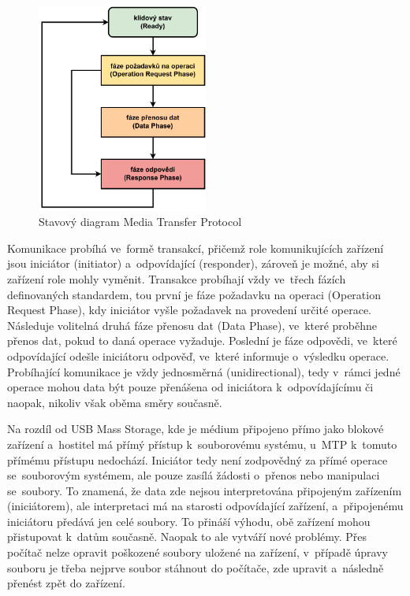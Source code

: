 \begin{figure}[h]
    \centering
    \includegraphics[width=0.50\textwidth]{obrazky-figures/mtp_phases-cz.pdf}
    
    \caption{Stavový diagram Media Transfer Protocol~\cite{usb_standard_mtp}}
    \label{fig:mtp-protocol}
\end{figure}

Komunikace probíhá ve~formě transakcí, přičemž role komunikujících zařízení jsou iniciátor (initiator) a~odpovídající (responder), zároveň je možné, aby si zařízení role mohly vyměnit. Transakce probíhají vždy ve~třech fázích definovaných standardem, tou první je fáze požadavku na operaci (Operation Request Phase), kdy iniciátor vyšle požadavek na provedení určité operace. Následuje volitelná druhá fáze přenosu dat (Data Phase), ve~které proběhne přenos dat, pokud to daná operace vyžaduje. Poslední je fáze odpovědi, ve~které odpovídající odešle iniciátoru odpověď, ve~které informuje o~výsledku operace. Probíhající komunikace je vždy jednosměrná (unidirectional), tedy v~rámci jedné operace mohou data být pouze přenášena od iniciátora k~odpovídajícímu či naopak, nikoliv však oběma směry současně.~\cite{usb_standard_mtp}


Na rozdíl od USB Mass Storage, kde je médium připojeno přímo jako blokové zařízení a~hostitel má přímý přístup k~souborovému systému, u~MTP k~tomuto přímému přístupu nedochází. Iniciátor tedy není zodpovědný za přímé operace se~souborovým systémem, ale pouze zasílá žádosti o~přenos nebo manipulaci se~soubory. To znamená, že data zde nejsou interpretována připojeným zařízením (iniciátorem), ale interpretaci má na starosti odpovídající zařízení, a~připojenému iniciátoru předává jen celé soubory. To přináší výhodu, obě zařízení mohou přistupovat k~datům současně. Naopak to ale vytváří nové problémy. Přes počítač nelze opravit poškozené soubory uložené na zařízení, v~případě úpravy souboru je třeba nejprve soubor stáhnout do počítače, zde upravit a~následně přenést zpět do zařízení.~\cite{usb_standard_mtp}

